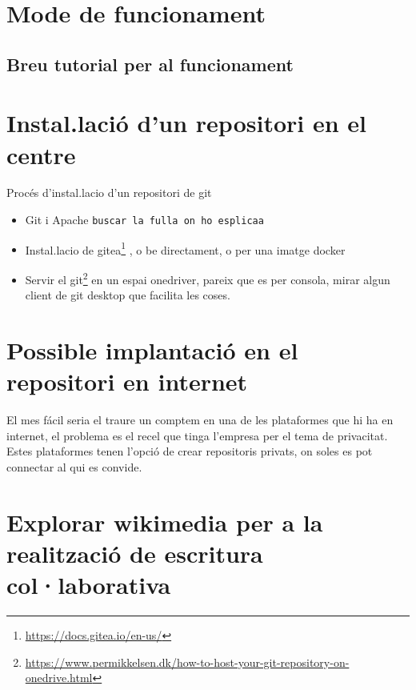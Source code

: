\documentclass[
  10pt, krantz2,
]{krantz}
\DeclareRobustCommand{\href}[2]{#2\footnote{\url{#1}}}
\renewcommand{\href}[2]{#2\footnote{\url{#1}}}
\begin{document}
\hypertarget{mode-de-funcionament}{%
\section{Mode de funcionament}\label{mode-de-funcionament}}

\hypertarget{breu-tutorial-per-al-funcionament}{%
\subsection{Breu tutorial per al funcionament}\label{breu-tutorial-per-al-funcionament}}

\hypertarget{instal.laciuxf3-dun-repositori-en-el-centre}{%
\section{Instal.lació d'un repositori en el centre}\label{instal.laciuxf3-dun-repositori-en-el-centre}}

Procés d'instal.lacio d'un repositori de git

\begin{itemize}
\item
  Git i Apache \texttt{buscar\ la\ fulla\ on\ ho\ esplicaa}
\item
  Instal.lacio de \href{https://docs.gitea.io/en-us/}{gitea} , o be directament, o per una imatge docker
\item
  Servir el \href{https://www.permikkelsen.dk/how-to-host-your-git-repository-on-onedrive.html}{git} en un espai onedriver, pareix que es per consola, mirar algun client de git desktop que facilita les coses.
\end{itemize}

\hypertarget{possible-implantaciuxf3-en-el-repositori-en-internet}{%
\section{Possible implantació en el repositori en internet}\label{possible-implantaciuxf3-en-el-repositori-en-internet}}

El mes fácil seria el traure un comptem en una de les plataformes que hi ha en internet, el problema es el recel que tinga l'empresa per el tema de privacitat. Estes plataformes tenen l'opció de crear repositoris privats, on soles es pot connectar al qui es convide.

\hypertarget{explorar-wikimedia-per-a-la-realitzaciuxf3-de-escritura-collaborativa}{%
\section{Explorar wikimedia per a la realització de escritura col·laborativa}\label{explorar-wikimedia-per-a-la-realitzaciuxf3-de-escritura-collaborativa}}
\end{document}
